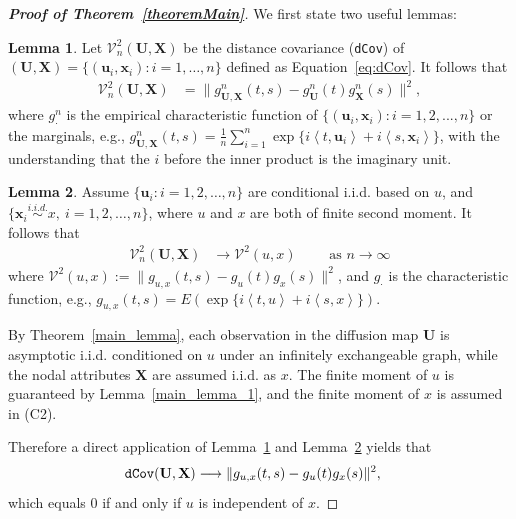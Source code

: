 \documentclass[11pt]{article}
\theoremstyle{definition}
\newtheorem{lemma}{Lemma}
\begin{document}
\begin{proof}[\textbf{Proof of Theorem~\ref{theoremMain}}]

We first state two useful lemmas:
\begin{lemma}
	\label{lemma2}
	Let $\mathcal{V}^2_{n}(\mathbf{U}, \mathbf{X})$ be the distance covariance (\texttt{dCov}) of $(\mathbf{U}, \mathbf{X}) = \{  ( \mathbf{u}_{i}, \mathbf{x}_{i}  )  : i = 1, \ldots, n \}$ defined as Equation~\ref{eq:dCov}.
	It follows that
\begin{eqnarray}
		\mathcal{V}^{2}_{n}(\mathbf{U},\mathbf{X}) &=   \|g_{\mathbf{U},\mathbf{X}}^{n}(t,s)-g_{\mathbf{U}}^{n}(t)g_{\mathbf{X}}^{n}(s)\|^{2},
\end{eqnarray}
	where $g_{\cdot}^{n}$ is the empirical characteristic function of $\{(\mathbf{u}_{i},\mathbf{x}_{i}) : i=1,2,...,n\}$ or the marginals, e.g., $g_{\mathbf{U},\mathbf{X}}^{n}(t,s)=\frac{1}{n}\sum_{i=1}^{n}\exp\{i \left\langle t,\mathbf{u}_{i} \right\rangle+i \left\langle s,\mathbf{x}_{i} \right\rangle\}$, with the understanding that the $i$ before the inner product is the imaginary unit.
\end{lemma}

\begin{lemma}
	\label{lemma3}
	Assume $\{ \mathbf{u}_{i} : i = 1,2, \ldots, n \}$ are conditional i.i.d. based on $u$, and $\{\mathbf{x}_{i} \stackrel{i.i.d.}{\sim} x,~i = 1, 2, \ldots, n\}$, where $u$ and $x$ are both of finite second moment. It follows that
	\begin{eqnarray}
	\mathcal{V}_{n}^{2}(\mathbf{U},\mathbf{X}) &\longrightarrow \mathcal{V}^{2}(u,x) \quad \quad \mbox{ as } n \rightarrow \infty
	\label{eq:conv1}
	\end{eqnarray}
	where $\mathcal{V}^{2} (u,x) := \| g_{u,x}(t,s) - g_{u}(t) g_{x}(s) \|^2$, and $g_{\cdot}$ is the characteristic function, e.g., $g_{u,x}(t,s) = E(\exp\{i \left\langle t,u \right\rangle  +i \left\langle  s,x\right\rangle \})$.
\end{lemma}

By Theorem~\ref{main_lemma}, each observation in the diffusion map $\mathbf{U}$ is asymptotic i.i.d. conditioned on $u$ under an infinitely exchangeable graph, while the nodal attributes $\mathbf{X}$ are assumed i.i.d. as $x$. The finite moment of $u$ is guaranteed by Lemma~\ref{main_lemma_1}, and the finite moment of $x$ is assumed in (C2).

Therefore a direct application of Lemma~\ref{lemma2} and Lemma~\ref{lemma3} yields that
\begin{eqnarray}
\mbox{\texttt{dCov}}(\mathbf{U},\mathbf{X}) &\longrightarrow \| g_{u,x}(t,s) - g_{u}(t) g_{x}(s) \|^2,
\end{eqnarray}
which equals $0$ if and only if $u$ is independent of $x$.


\end{proof}
\end{document}
